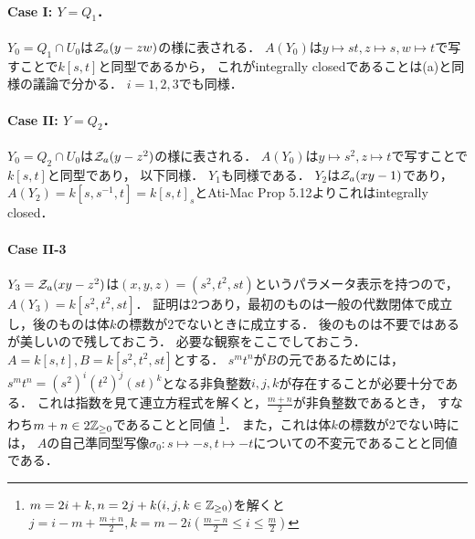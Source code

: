 \documentclass[a4paper]{jsarticle}
\begin{document}
    \paragraph{Case I: $Y=Q_1$．}
    $Y_0=Q_1 \cap U_0$は$\mathcal{Z}_a(y-zw)$の様に表される．
    $A(Y_0)$は$y \mapsto st, z \mapsto s, w \mapsto t$で写すことで$k[s,t]$と同型であるから，
    これがintegrally closedであることは(a)と同様の議論で分かる．
    $i=1,2,3$でも同様．

    \paragraph{Case II: $Y=Q_2$．}
    $Y_0=Q_2 \cap U_0$は$\mathcal{Z}_a(y-z^2)$の様に表される．
    $A(Y_0)$は$y \mapsto s^2, z \mapsto t$で写すことで$k[s,t]$と同型であり，
    以下同様．
    $Y_1$も同様である．
    $Y_2$は$\mathcal{Z}_a(xy-1)$であり，
    $A(Y_2)=k[s,s^{-1},t]=k[s,t]_{s}$とAti-Mac Prop 5.12よりこれはintegrally closed．

    \paragraph{Case II-3}
    $Y_3=\mathcal{Z}_a(xy-z^2)$は$(x,y,z)=(s^2,t^2,st)$というパラメータ表示を持つので，$A(Y_3)=k[s^2,t^2,st]$．
    証明は2つあり，最初のものは一般の代数閉体で成立し，後のものは体$k$の標数が2でないときに成立する．
    後のものは不要ではあるが美しいので残しておこう．
    必要な観察をここでしておこう．
    $A=k[s,t], B=k[s^2,t^2,st]$とする．
    $s^m t^n$が$B$の元であるためには，
    $s^m t^n=(s^2)^i (t^2)^j (st)^k$となる非負整数$i,j,k$が存在することが必要十分である．
    これは指数を見て連立方程式を解くと，$\frac{m+n}{2}$が非負整数であるとき，
    すなわち$m+n \in 2\mathbb{Z}_{\geq 0}$であることと同値
    \footnote{$m=2i+k, n=2j+k (i,j,k \in \mathbb{Z}_{\geq 0})$を解くと$j=i-m+\frac{m+n}{2}, k=m-2i (\frac{m-n}{2} \leq i \leq \frac{m}{2})$}．
    また，これは体$k$の標数が2でない時には，
    $A$の自己準同型写像$\sigma_0: s \mapsto -s, t \mapsto -t$についての不変元であることと同値である．
\end{document}
